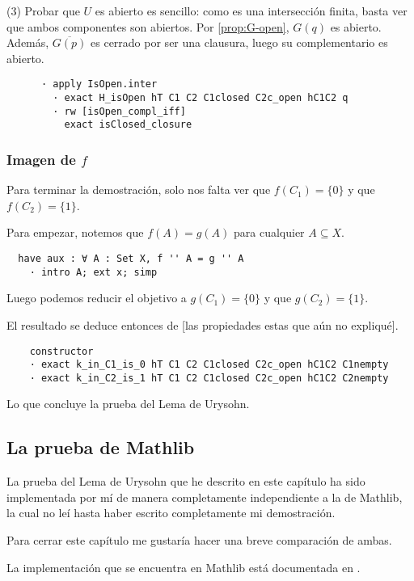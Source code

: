 (3) Probar que $U$ es abierto es sencillo: como es una intersección finita, basta ver que ambos componentes son abiertos. Por \ref{prop:G-open}, $G(q)$ es abierto. Además, $\overline{G(p)}$ es cerrado por ser una clausura, luego su complementario es abierto.

\begin{lstlisting}
      · apply IsOpen.inter
        · exact H_isOpen hT C1 C2 C1closed C2c_open hC1C2 q
        · rw [isOpen_compl_iff]
          exact isClosed_closure
\end{lstlisting}

\subsubsection{Imagen de $f$}

Para terminar la demostración, solo nos falta ver que $f(C_1) = \{0\}$ y que $f(C_2) = \{1\}$.

Para empezar, notemos que $f(A) = g(A)$ para cualquier $A \subseteq X$.

\begin{lstlisting}
  have aux : ∀ A : Set X, f '' A = g '' A
    · intro A; ext x; simp
\end{lstlisting}

Luego podemos reducir el objetivo a $g(C_1) = \{0\}$ y que $g(C_2) = \{1\}$.

El resultado se deduce entonces de [las propiedades estas que aún no expliqué].

\begin{lstlisting}
    constructor
    · exact k_in_C1_is_0 hT C1 C2 C1closed C2c_open hC1C2 C1nempty
    · exact k_in_C2_is_1 hT C1 C2 C1closed C2c_open hC1C2 C2nempty
\end{lstlisting}

Lo que concluye la prueba del Lema de Urysohn.


\subsection{La prueba de Mathlib}

La prueba del Lema de Urysohn que he descrito en este capítulo ha sido implementada por mí de manera completamente independiente a la de Mathlib, la cual no leí hasta haber escrito completamente mi demostración.

Para cerrar este capítulo me gustaría hacer una breve comparación de ambas.

La implementación que se encuentra en Mathlib está documentada en \cite{mathlib2023urysohn}.

